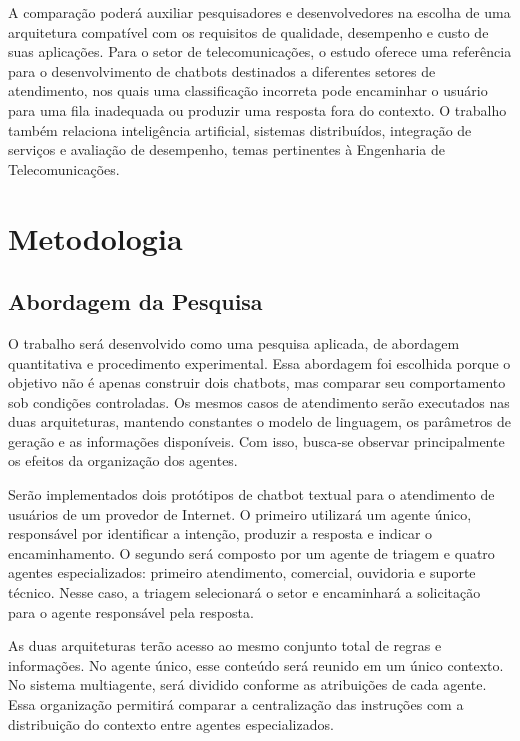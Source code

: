 \documentclass[11pt]{ifscarticle}
\begin{document}
A comparação poderá auxiliar pesquisadores e desenvolvedores na escolha de uma arquitetura compatível com os requisitos de qualidade, desempenho e custo de suas aplicações. Para o setor de telecomunicações, o estudo oferece uma referência para o desenvolvimento de chatbots destinados a diferentes setores de atendimento, nos quais uma classificação incorreta pode encaminhar o usuário para uma fila inadequada ou produzir uma resposta fora do contexto. O trabalho também relaciona inteligência artificial, sistemas distribuídos, integração de serviços e avaliação de desempenho, temas pertinentes à Engenharia de Telecomunicações.

\section{Metodologia}

\subsection{Abordagem da Pesquisa}

O trabalho será desenvolvido como uma pesquisa aplicada, de abordagem quantitativa e procedimento experimental. Essa abordagem foi escolhida porque o objetivo não é apenas construir dois chatbots, mas comparar seu comportamento sob condições controladas. Os mesmos casos de atendimento serão executados nas duas arquiteturas, mantendo constantes o modelo de linguagem, os parâmetros de geração e as informações disponíveis. Com isso, busca-se observar principalmente os efeitos da organização dos agentes.

Serão implementados dois protótipos de chatbot textual para o atendimento de usuários de um provedor de Internet. O primeiro utilizará um agente único, responsável por identificar a intenção, produzir a resposta e indicar o encaminhamento. O segundo será composto por um agente de triagem e quatro agentes especializados: primeiro atendimento, comercial, ouvidoria e suporte técnico. Nesse caso, a triagem selecionará o setor e encaminhará a solicitação para o agente responsável pela resposta.

As duas arquiteturas terão acesso ao mesmo conjunto total de regras e informações. No agente único, esse conteúdo será reunido em um único contexto. No sistema multiagente, será dividido conforme as atribuições de cada agente. Essa organização permitirá comparar a centralização das instruções com a distribuição do contexto entre agentes especializados.
\end{document}
